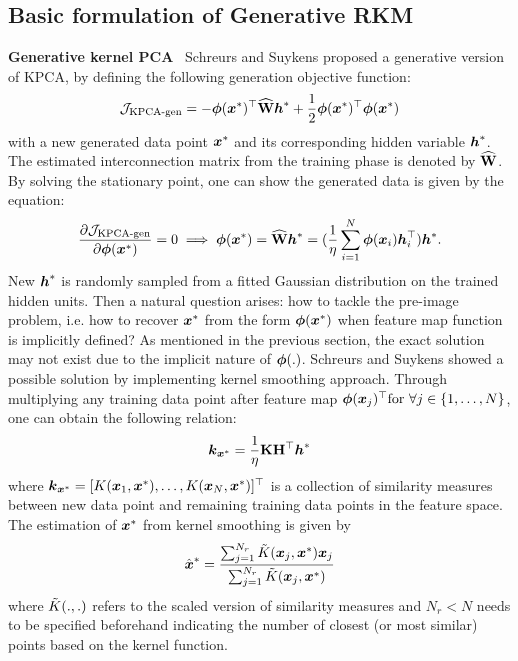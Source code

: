 \subsection{Basic formulation of Generative RKM}
\label{subsec-basicformulaGenRKM}
\noindent\textbf{Generative kernel PCA} \ Schreurs and Suykens \cite{schreursGenerativeKernelPCA2018} proposed a generative version of KPCA, by defining the following generation objective function:
\begin{equation} 
    \mathcal{J}_{\text{KPCA-gen}} = -\boldsymbol{\phi}(\boldsymbol{x}^{*})^\top\widehat{\mathbf{W}}\boldsymbol{h}^{*} + \frac{1}{2}\boldsymbol{\phi}(\boldsymbol{x}^*)^{\top}\boldsymbol{\phi}(\boldsymbol{x}^*)
\end{equation}
with a new generated data point $\boldsymbol{x}^{*}$ and its corresponding hidden variable $\boldsymbol{h}^{*}$. The estimated interconnection matrix from the training phase is denoted by $\widehat{\mathbf{W}}$. By solving the stationary point, one can show the generated data is given by the equation:
\begin{equation}
\frac{\partial\mathcal{J}_{\text{KPCA-gen}}}{\partial \boldsymbol{\phi}(\boldsymbol{x}^{*})} = 0 \implies \boldsymbol{\phi}(\boldsymbol{x}^{*}) = \widehat{\mathbf{W}}\boldsymbol{h}^{*} = (\frac{1}{\eta}\sum_{i=1}^{N}\boldsymbol{\phi}(\boldsymbol{x}_i)\boldsymbol{h}_i^\top)\boldsymbol{h}^{*}.
\end{equation}
New $\boldsymbol{h}^{*}$ is randomly sampled from a fitted Gaussian distribution on the trained hidden units. Then a natural question arises: how to tackle the pre-image problem, i.e. how to recover $\boldsymbol{x}^{*}$ from the form $\boldsymbol{\phi}(\boldsymbol{x}^*)$ when feature map function is implicitly defined? As mentioned in the previous section, the exact solution may not exist due to the implicit nature of $\boldsymbol{\phi}(.)$. Schreurs and Suykens \cite{schreursGenerativeKernelPCA2018} showed a possible solution by implementing kernel smoothing approach. Through 
multiplying any training data point after feature map $\boldsymbol{\phi}(\boldsymbol{x}_j)^{\top} \text{for }\forall j\in \{1,\dots,N\}$, one can obtain the following relation:
\begin{equation}
    \boldsymbol{k}_{\boldsymbol{x}^*} = \frac{1}{\eta}\mathbf{K}\mathbf{H}^\top\boldsymbol{h}^*
\end{equation}
where $\boldsymbol{k}_{\boldsymbol{x}^*} = [K(\boldsymbol{x}_1,\boldsymbol{x}^*),\dots,K(\boldsymbol{x}_N,\boldsymbol{x}^*)]^\top$ is a collection of similarity measures between new data point and remaining training data points in the feature space. The estimation of $\boldsymbol{x}^*$ from kernel smoothing is given by
\begin{equation}
    \hat{\boldsymbol{x}}^* = \frac{\sum_{j=1}^{N_r}\Tilde{K}(\boldsymbol{x}_j,\boldsymbol{x}^*)\boldsymbol{x}_j}{\sum_{j=1}^{N_r}\Tilde{K}(\boldsymbol{x}_j,\boldsymbol{x}^*)}
\end{equation}
where $\Tilde{K}(.,.)$ refers to the scaled version of similarity measures and $N_r < N$ needs to be specified beforehand indicating the number of closest (or most similar) points based on the kernel function.

